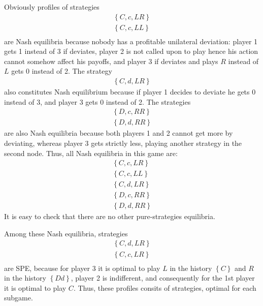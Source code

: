 \documentclass[a4paper]{article}
\begin{document}
Obviously profiles of strategies
\begin{align*}
\left\{C, c, LR\right\}\\
\left\{C, c, LL\right\}\\
\end{align*}
are Nash equilibria because nobody has a profitable unilateral deviation: player 1 gets 1 instead of 3 if deviates, player 2 is not called upon to play hence his action cannot somehow affect his payoffs, and player 3 if deviates and plays $R$ instead of $L$ gets 0 instead of 2. The strategy
\begin{align*}
\left\{C, d, LR\right\}
\end{align*}
also constitutes Nash equilibrium because if player 1 decides to deviate he gets 0 instead of 3, and player 3 gets 0 instead of 2. The strategies
\begin{align*}
\left\{D, c, RR\right\}\\
\left\{D, d, RR\right\}
\end{align*}
are also Nash equilibria because both players 1 and 2 cannot get more by deviating, whereas player 3 gets strictly less, playing another strategy in the second node. Thus, all Nash equilibria in this game are:
\begin{align*}
\left\{C, c, LR\right\}\\
\left\{C, c, LL\right\}\\
\left\{C, d, LR\right\}\\
\left\{D, c, RR\right\}\\
\left\{D, d, RR\right\}
\end{align*}
It is easy to check that there are no other pure-strategies equilibria.

Among these Nash equilibria, strategies
\begin{align*}
\left\{C, d, LR\right\}\\
\left\{C, c, LR\right\}\\
\end{align*}
are SPE, because for player 3 it is optimal to play $L$ in the history $\left\{C\right\}$ and $R$ in the history $\left\{Dd\right\}$, player 2 is indifferent, and consequently for the 1st player it is optimal to play $C$. Thus, these profiles consits of strategies, optimal for each subgame.
\end{document}
